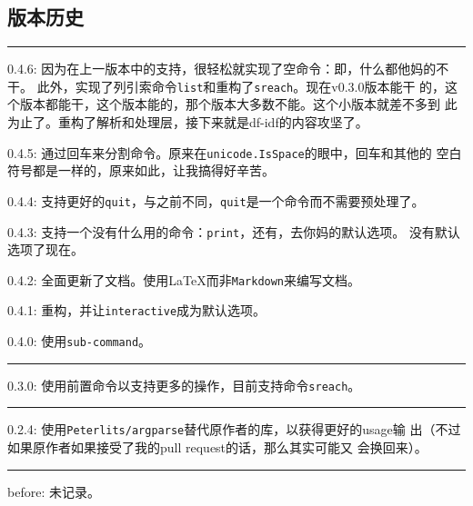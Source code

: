 \documentclass{peterlitsdoc}
\def\hline{\begingroup
    \noindent\pltgray\rule{\textwidth}{0.5pt}%
    \endgroup}
\begin{document}
\subsection{版本历史}

\hline

0.4.6: 因为在上一版本中的支持，很轻松就实现了空命令：即，什么都他妈的不干。
此外，实现了列引索命令\verb|list|和重构了\verb|sreach|。现在v0.3.0版本能干
的，这个版本都能干，这个版本能的，那个版本大多数不能。这个小版本就差不多到
此为止了。重构了解析和处理层，接下来就是df-idf的内容攻坚了。

0.4.5: 通过回车来分割命令。原来在\verb|unicode.IsSpace|的眼中，回车和其他的
空白符号都是一样的，原来如此，让我搞得好辛苦。

0.4.4: 支持更好的\verb|quit|，与之前不同，\verb|quit|是一个命令而不需要预处理了。

0.4.3: 支持一个没有什么用的命令：\verb|print|，还有，去你妈的默认选项。
没有默认选项了现在。

0.4.2: 全面更新了文档。使用\LaTeX{}而非\verb|Markdown|来编写文档。

0.4.1: 重构，并让\verb|interactive|成为默认选项。

0.4.0: 使用\verb|sub-command|。

\hline

0.3.0: 使用前置命令以支持更多的操作，目前支持命令\verb|sreach|。

\hline

0.2.4: 使用\verb|Peterlits/argparse|替代原作者的库，以获得更好的usage输
出（不过如果原作者如果接受了我的pull request的话，那么其实可能又
会换回来）。

\hline

before: 未记录。
\end{document}
